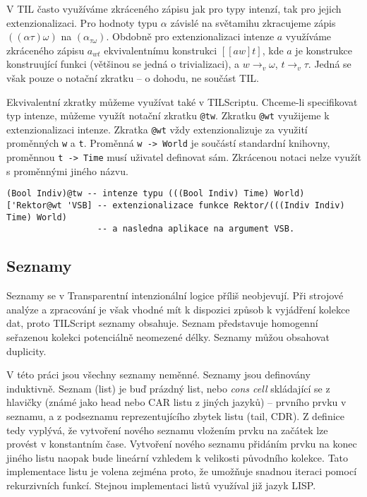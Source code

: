 V TIL často využíváme zkráceného zápisu jak pro typy intenzí, tak pro jejich extenzionalizaci.
Pro hodnoty typu $\alpha$ závislé na světamihu zkracujeme zápis $((\alpha\tau)\omega)$
na $(\alpha_{\tau\omega})$. Obdobně pro extenzionalizaci intenze $a$ využíváme zkráceného zápisu
$a_{wt}$ ekvivalentnímu konstrukci $[[a w] t]$, kde $a$ je konstrukce konstruující funkci
(většinou se jedná o trivializaci), a $w \rightarrow_v \omega$, $t \rightarrow_v \tau$. Jedná
se však pouze o notační zkratku -- o dohodu, ne součást TIL.

Ekvivalentní zkratky můžeme využívat také v TILScriptu. Chceme-li specifikovat typ intenze, můžeme
využít notační zkratku \lstinline{@tw}. Zkratku \lstinline{@wt} využijeme k extenzionalizaci
intenze. Zkratka \lstinline{@wt} vždy extenzionalizuje za využití proměnných \lstinline{w} a
\lstinline{t}. Proměnná \lstinline{w -> World} je součástí standardní knihovny, proměnnou
\lstinline{t -> Time} musí uživatel definovat sám. Zkrácenou notaci nelze využít s proměnnými
jiného názvu.

\begin{lstlisting}[caption={Příklad využití zkrácené notace}]
(Bool Indiv)@tw -- intenze typu (((Bool Indiv) Time) World)
['Rektor@wt 'VSB] -- extenzionalizace funkce Rektor/(((Indiv Indiv) Time) World)
                  -- a nasledna aplikace na argument VSB.
\end{lstlisting}

\subsection{Seznamy}

Seznamy se v Transparentní intenzionální logice příliš neobjevují. Při strojové analýze a
zpracování je však vhodné mít k dispozici způsob k vyjádření kolekce dat, proto TILScript seznamy
obsahuje. Seznam představuje homogenní seřazenou kolekci potenciálně neomezené délky. Seznamy můžou
obsahovat duplicity.

V této práci jsou všechny seznamy neměnné. Seznamy jsou definovány induktivně. Seznam (list) je buď
prázdný list, nebo \textit{cons cell} skládající se z hlavičky (známé jako head nebo CAR listu
z jiných jazyků) -- prvního prvku v seznamu, a z podseznamu reprezentujícího zbytek listu
(tail, CDR). Z definice tedy vyplývá, že vytvoření nového seznamu vložením prvku na začátek lze
provést v konstantním čase. Vytvoření nového seznamu přidáním prvku na konec jiného listu naopak
bude lineární vzhledem k velikosti původního kolekce. Tato implementace listu je volena zejména
proto, že umožňuje snadnou iteraci pomocí rekurzivních funkcí. Stejnou implementaci listů využíval
již jazyk LISP.

